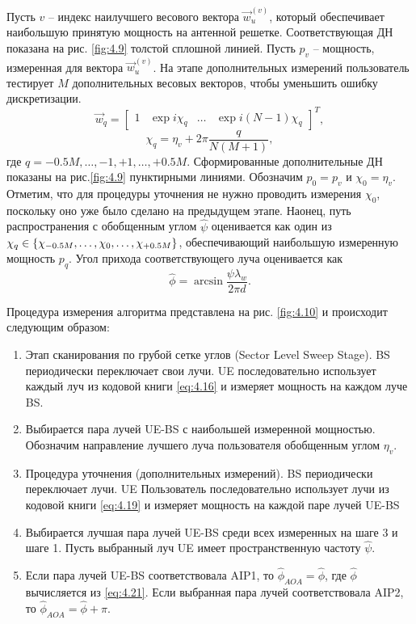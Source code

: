 Пусть $v$ -- индекс наилучшего весового вектора $\vec w_u^{(v)}$, который
обеспечивает наибольшую принятую мощность на антенной решетке.  Соответствующая
ДН показана на рис. \ref{fig:4.9} толстой сплошной линией. Пусть $p_v$ --
мощность, измеренная для вектора $\vec w_u^{(v)}$. На этапе дополнительных измерений
пользователь тестирует $M$ дополнительных весовых векторов, чтобы уменьшить
ошибку дискретизации.
\begin{equation}
    \label{eq:4.19}
    \vec w_q =
    \begin{bmatrix}
        1 & \exp {i \chi_q} & \dots & \exp{i(N-1)\chi_q}
    \end{bmatrix}^T,
\end{equation}
\begin{equation}
    \label{eq:4.20}
    \chi_q = \eta_v + 2\pi \frac{q}{N(M+1)},
\end{equation}
где $q=-0.5M,\dots,-1,+1,\dots,+0.5M$. Сформированные дополнительные ДН показаны
на рис.\ref{fig:4.9} пунктирными линиями.  Обозначим $p_0= p_v$ и $\chi_0 =
    \eta_v$. Отметим, что для процедуры уточнения не нужно проводить измерения
$\chi_0$, поскольку оно уже было сделано на предыдущем этапе.  Наонец, путь
распространения с обобщенным углом $\hat \psi$ оценивается как один из $\chi_q
    \in \qty{\chi_{-0.5 M}, \dots, \chi_0, \dots, \chi_{+0.5M}}$, обеспечивающий
наибольшую измеренную мощность $p_q$. Угол прихода соответствующего луча
оценивается как
\begin{equation}
    \label{eq:4.21}
    \hat \phi = \arcsin{\frac{\psi \lambda_w}{2\pi d}}.
\end{equation}

Процедура измерения алгоритма представлена на рис. \ref{fig:4.10} и происходит следующим образом:

\begin{enumerate}[label=\textbf{Шаг \arabic*:}]
    \item Этап сканирования по грубой сетке углов (Sector Level Sweep Stage). 
          BS периодически переключает свои лучи. 
          UE последовательно использует каждый луч из кодовой книги \eqref{eq:4.16} 
          и измеряет мощность на каждом луче BS.
    \item Выбирается пара лучей UE-BS с наибольшей измеренной мощностью.
          Обозначим направление лучшего луча пользователя обобщенным углом $\eta_v$.
    \item Процедура уточнения (дополнительных измерений). BS периодически переключает лучи. UE
          Пользователь последовательно использует лучи из кодовой книги \eqref{eq:4.19} 
          и измеряет мощность на каждой паре лучей UE-BS
    \item Выбирается лучшая пара лучей UE-BS среди всех измеренных на шаге 3 и шаге 1. 
    Пусть выбранный луч UE имеет пространственную частоту $\hat \psi$.
    \item Если пара лучей UE-BS соответствовала AIP1, то $\hat \phi_{AOA} = \hat \phi$, где 
    $\hat \phi$ вычисляется из \eqref{eq:4.21}.
    Если выбранная пара лучей соответствовала AIP2, то $\hat \phi_{AOA} = \hat \phi + \pi$. 
\end{enumerate}

